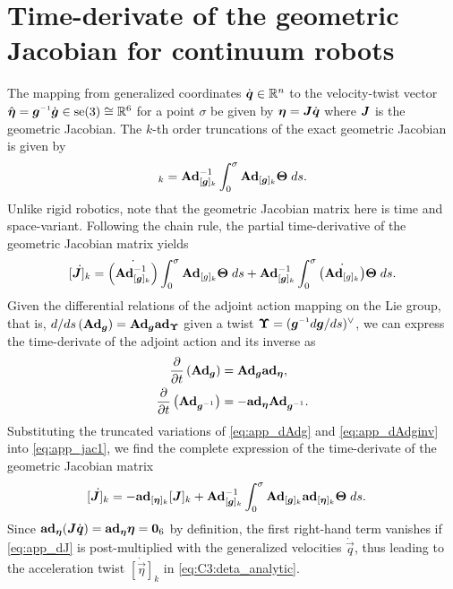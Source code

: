 \section{Time-derivate of the geometric Jacobian for continuum robots} 
\label{app:C3:jacobian}
The mapping from generalized coordinates $\dot{\boldsymbol{q}} \in \mathbb{R}^n$ to the velocity-twist vector $\hat{\vec{\eta}} = \vec{g}\inv \dot{\mat{g}} \in \seg{3} \cong \R^6$ for a point $\sigma$ be given by $\boldsymbol{\eta}= \boldsymbol{J}\dot{\boldsymbol{q}}$ where $\boldsymbol{J}$ is the geometric Jacobian. The $k$-th order truncations of the exact geometric Jacobian is given by
%
\begin{equation}
[\mat{J}]_k = \Ad_{{[\mat{g}]_k}}^{-1} \int_0^\sigma \Ad_{[\mat{g}]_k} \mat{\Theta} \; ds. \label{eq:app_jac0}
\end{equation}
Unlike rigid robotics, note that the geometric Jacobian matrix here is time and space-variant. Following the chain rule, the partial time-derivative of the geometric Jacobian matrix yields
%
\begin{equation}
\dot{[\boldsymbol{J}]_k} = \dot{\left(\textbf{Ad}_{{[\boldsymbol{g}]_k}}^{-1}\right)} \int_0^\sigma \textbf{Ad}_{[g]_k} \boldsymbol{\Theta} \; ds + \textbf{Ad}_{{[\boldsymbol{g}]_k}}^{-1} \int_0^\sigma \dot{\left(\textbf{Ad}_{[g]_k}\right)} \boldsymbol{\Theta} \; ds. \label{eq:app_jac1}
\end{equation}
%
Given the differential relations of the adjoint action mapping on the Lie group, that is, ${d/ds}\left(\textbf{Ad}_{\boldsymbol{g}} \right) = \textbf{Ad}_{\boldsymbol{g}} \textbf{ad}_{\boldsymbol{\Upsilon}}$ given a twist $\vec{\Upsilon} = (\mat{g}\inv d\mat{g}/ds)^\vee$, we can express the time-derivate of the adjoint action and its inverse as
%
\begin{align}
\frac{\p}{\p t}\left(\Ad_{\mat{g}} \right) & = \Ad_{\mat{g}} \ad_{\vec{\eta}}, \label{eq:app_dAdg}\\
\frac{\p}{\p t}\left(\Ad_{\mat{g}\inv} \right) & = -\ad_{\vec{\eta}}\Ad_{\mat{g}\inv}. \label{eq:app_dAdginv}
\end{align}
%
Substituting the truncated variations of \eqref{eq:app_dAdg} and \eqref{eq:app_dAdginv} into \eqref{eq:app_jac1}, we find the complete expression of the time-derivate of the geometric Jacobian matrix
%
\begin{align}
\dot{[\boldsymbol{J}]_k} & = -\textbf{ad}_{[\boldsymbol{\eta}]_k} {[\boldsymbol{J}]_k} + \textbf{Ad}_{{[\boldsymbol{g}]_k}}^{-1} \int_0^\sigma \textbf{Ad}_{{[\boldsymbol{g}]_k}} \textbf{ad}_{[\boldsymbol{\eta}]_k} \boldsymbol{\Theta}\; ds. \label{eq:app_dJ}
\end{align}
%
Since $\textbf{ad}_{\boldsymbol{\eta}} (\boldsymbol{J} \dot{\boldsymbol{q}}) = \textbf{ad}_{\boldsymbol{\eta}} \boldsymbol{\eta} = \boldsymbol{0}_6$ by definition, the first right-hand term vanishes if \eqref{eq:app_dJ} is post-multiplied with the generalized velocities $\dot{\vec{q}}$, thus leading to the acceleration twist $\dot{[\vec{\eta}]}_k$ in \eqref{eq:C3:deta_analytic}. \clearpage

